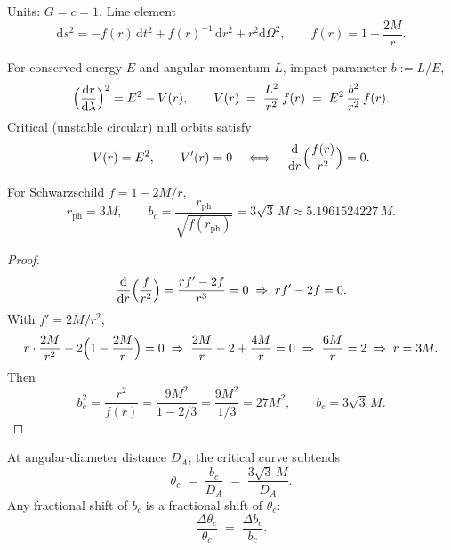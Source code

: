 Units: \(G=c=1\). Line element
\[
\mathrm{d}s^2
=
-f(r)\,\mathrm{d}t^2
+f(r)^{-1}\,\mathrm{d}r^2
+r^2\mathrm{d}\Omega^2,
\qquad
f(r)=1-\frac{2M}{r}.
\]

\begin{definition}
For conserved energy \(E\) and angular momentum \(L\), impact parameter
\(b:=L/E\),
\begin{equation}
\label{eq:V}
\Bigl(\frac{\mathrm{d}r}{\mathrm{d}\lambda}\Bigr)^2
=
E^2 - V(r),
\qquad
V(r)
\;=\;
\frac{L^2}{r^2}\,f(r)
\;=\;
E^2\,\frac{b^2}{r^2}\,f(r).
\end{equation}
Critical (unstable circular) null orbits satisfy
\begin{equation}
\label{eq:crit}
V(r)=E^2,
\qquad
V'(r)=0
\quad\Longleftrightarrow\quad
\frac{\mathrm{d}}{\mathrm{d}r}\Bigl(\frac{f(r)}{r^2}\Bigr)=0.
\end{equation}
\end{definition}

\begin{lemma}
\label{lem:bc}
For Schwarzschild \(f=1-2M/r\),
\begin{equation}
\label{eq:rph-bc}
r_{\mathrm{ph}}=3M,
\qquad
b_c
=
\frac{r_{\mathrm{ph}}}{\sqrt{f(r_{\mathrm{ph}})}}
=
3\sqrt{3}\,M
\approx 5.1961524227\,M.
\end{equation}
\end{lemma}

\begin{proof}
\[
\frac{\mathrm{d}}{\mathrm{d}r}\Bigl(\frac{f}{r^2}\Bigr)
=
\frac{r f'-2f}{r^3}
=0
\;\Rightarrow\;
r f'-2f=0.
\]
With \(f'=2M/r^2\),
\[
r\cdot\frac{2M}{r^2}-2\Bigl(1-\frac{2M}{r}\Bigr)=0
\;\Rightarrow\;
\frac{2M}{r}-2+\frac{4M}{r}=0
\;\Rightarrow\;
\frac{6M}{r}=2
\;\Rightarrow\;
r=3M.
\]
Then
\[
b_c^2=\frac{r^2}{f(r)}
=\frac{9M^2}{1-2/3}
=\frac{9M^2}{1/3}
=27M^2,
\qquad
b_c=3\sqrt{3}\,M.
\]
\end{proof}

\begin{corollary}
At angular-diameter distance \(D_A\), the critical curve subtends
\[
\theta_c
\;=\;
\frac{b_c}{D_A}
\;=\;
\frac{3\sqrt{3}\,M}{D_A}.
\]
Any fractional shift of \(b_c\) is a fractional shift of \(\theta_c\):
\begin{equation}
\label{eq:theta}
\frac{\Delta\theta_c}{\theta_c}
\;=\;
\frac{\Delta b_c}{b_c}.
\end{equation}
\end{corollary}

